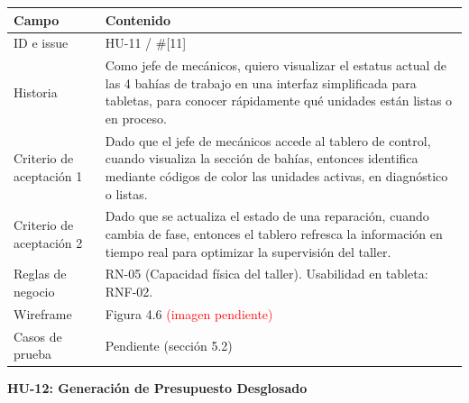 {\def\LTcaptype{none} %
\begin{longtable}[]{@{}
  >{\raggedright\arraybackslash}p{}
  >{\raggedright\arraybackslash}p{}@{}}
\toprule\noalign{}
\begin{minipage}[b]{\linewidth}\raggedright
\textbf{Campo}
\end{minipage} & \begin{minipage}[b]{\linewidth}\raggedright
\textbf{Contenido}
\end{minipage} \\
\midrule\noalign{}
\endhead
\bottomrule\noalign{}
\endlastfoot
ID e issue & HU-11 / \#{[}11{]} \\
Historia & Como jefe de mecánicos, quiero visualizar el estatus actual
de las 4 bahías de trabajo en una interfaz simplificada para tabletas,
para conocer rápidamente qué unidades están listas o en proceso. \\
Criterio de aceptación 1 & Dado que el jefe de mecánicos accede al
tablero de control, cuando visualiza la sección de bahías, entonces
identifica mediante códigos de color las unidades activas, en
diagnóstico o listas. \\
Criterio de aceptación 2 & Dado que se actualiza el estado de una
reparación, cuando cambia de fase, entonces el tablero refresca la
información en tiempo real para optimizar la supervisión del taller. \\
Reglas de negocio & RN-05 (Capacidad física del taller). Usabilidad en
tableta: RNF-02. \\
Wireframe & Figura 4.6 \textcolor{red}{(imagen pendiente)} \\
Casos de prueba & Pendiente (sección 5.2) \\
\end{longtable}
}

\textbf{HU-12: Generación de Presupuesto Desglosado}


